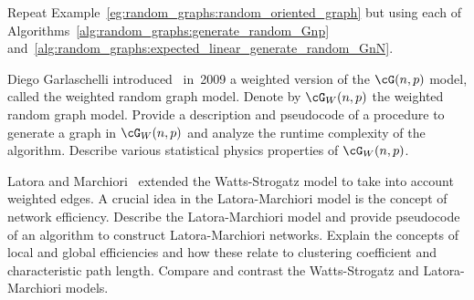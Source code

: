 \begin{problem}
\item Repeat Example~\ref{eg:random_graphs:random_oriented_graph} but
  using each of Algorithms~\ref{alg:random_graphs:generate_random_Gnp}
  and~\ref{alg:random_graphs:expected_linear_generate_random_GnN}.

\item Diego Garlaschelli
  introduced~\cite{Garlaschelli2009} in~2009 a weighted version of the
  $\cG(n,p)$ model, called the weighted
  random graph model. Denote by $\cG_W(n,p)$ the weighted random graph
  model. Provide a description and pseudocode of a procedure to
  generate a graph in $\cG_W(n,p)$ and analyze the runtime complexity
  of the algorithm. Describe various statistical physics properties of
  $\cG_W(n,p)$.

\item Latora and
  Marchiori~\cite{LatoraMarchiori2003} extended
  the Watts-Strogatz model to take into
  account weighted edges. A crucial idea in the
  Latora-Marchiori model is the concept
  of network efficiency. Describe the Latora-Marchiori model and
  provide pseudocode of an algorithm to construct Latora-Marchiori
  networks. Explain the concepts of local and global efficiencies and
  how these relate to clustering coefficient and characteristic path
  length. Compare and contrast the Watts-Strogatz and Latora-Marchiori
  models.
\end{problem}
